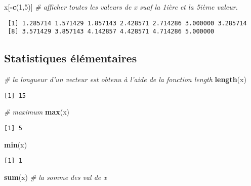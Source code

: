 \documentclass[
]{article}
\newenvironment{Shaded}{\begin{snugshade}}{\end{snugshade}}
\newcommand{\CommentTok}[1]{\textcolor[rgb]{0.56,0.35,0.01}{\textit{#1}}}
\newcommand{\DecValTok}[1]{\textcolor[rgb]{0.00,0.00,0.81}{#1}}
\newcommand{\KeywordTok}[1]{\textcolor[rgb]{0.13,0.29,0.53}{\textbf{#1}}}
\newcommand{\NormalTok}[1]{#1}
\newcommand{\OperatorTok}[1]{\textcolor[rgb]{0.81,0.36,0.00}{\textbf{#1}}}
\begin{document}
\begin{Shaded}
\begin{Highlighting}[]
\NormalTok{x[}\OperatorTok{-}\KeywordTok{c}\NormalTok{(}\DecValTok{1}\NormalTok{,}\DecValTok{5}\NormalTok{)]  }\CommentTok{# afficher toutes les valeurs de x suaf la 1ière et la 5ième valeur.}
\end{Highlighting}
\end{Shaded}

\begin{verbatim}
 [1] 1.285714 1.571429 1.857143 2.428571 2.714286 3.000000 3.285714
 [8] 3.571429 3.857143 4.142857 4.428571 4.714286 5.000000
\end{verbatim}

\hypertarget{statistiques-uxe9luxe9mentaires}{%
\subsection{Statistiques
élémentaires}\label{statistiques-uxe9luxe9mentaires}}

\begin{Shaded}
\begin{Highlighting}[]
\CommentTok{# la longueur d'un vecteur est obtenu à l'aide de la fonction length}
\KeywordTok{length}\NormalTok{(x)}
\end{Highlighting}
\end{Shaded}

\begin{verbatim}
[1] 15
\end{verbatim}

\begin{Shaded}
\begin{Highlighting}[]
\CommentTok{# maximum}
\KeywordTok{max}\NormalTok{(x)}
\end{Highlighting}
\end{Shaded}

\begin{verbatim}
[1] 5
\end{verbatim}

\begin{Shaded}
\begin{Highlighting}[]
\KeywordTok{min}\NormalTok{(x)}
\end{Highlighting}
\end{Shaded}

\begin{verbatim}
[1] 1
\end{verbatim}

\begin{Shaded}
\begin{Highlighting}[]
\KeywordTok{sum}\NormalTok{(x) }\CommentTok{# la somme des val de x}
\end{Highlighting}
\end{Shaded}
\end{document}
